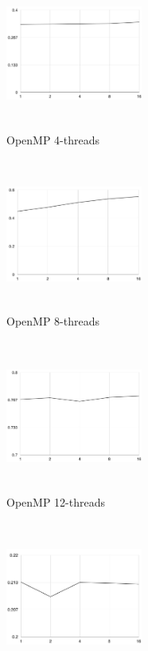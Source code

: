 \documentclass[11pt]{article}
\begin{document}
\begin{figure}[ht]
    \centering
    \begin{subfigure}[h!]{0.3\textwidth}
        \centering
        \includegraphics[width=4.5cm,height=5cm,keepaspectratio]{o_c4}
        \caption{OpenMP 4-threads}
        \label{fig:C4}
    \end{subfigure}
    \hfill
    \begin{subfigure}[h!]{0.3\textwidth}
        \centering
        \includegraphics[width=4.5cm,height=5cm,keepaspectratio]{o_c8}
        \caption{OpenMP 8-threads}
        \label{fig:C8}
    \end{subfigure}
    \hfill
    \begin{subfigure}[h!]{0.3\textwidth}
        \centering
        \includegraphics[width=4.5cm,height=5cm,keepaspectratio]{o_c12}
        \caption{OpenMP 12-threads}
        \label{fig:C12}
    \end{subfigure}
    \hfill
    \begin{subfigure}[h!]{0.3\textwidth}
        \centering
        \includegraphics[width=4.5cm,height=5cm,keepaspectratio]{m_4}

\end{subfigure}
\end{figure}
\end{document}

